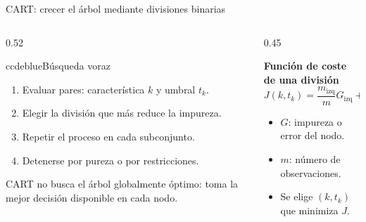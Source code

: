 \documentclass[aspectratio=169,11pt,table]{beamer}
\begin{document}
\begin{frame}{CART: crecer el árbol mediante divisiones binarias}
\footnotesize
\begin{columns}[T,onlytextwidth]
\begin{column}{0.52\textwidth}
\begin{contrastbox}{ccdeblue}{Búsqueda voraz}
\footnotesize
\begin{enumerate}
  \item Evaluar pares: característica \(k\) y umbral \(t_k\).
  \item Elegir la división que más reduce la impureza.
  \item Repetir el proceso en cada subconjunto.
  \item Detenerse por pureza o por restricciones.
\end{enumerate}
\end{contrastbox}
\vspace{0.22cm}
\begin{keybox}
CART no busca el árbol globalmente óptimo: toma la mejor decisión disponible en cada nodo.
\end{keybox}
\end{column}
\begin{column}{0.45\textwidth}
\begin{ccdebox}
\centering
\textbf{Función de coste de una división}
\[
J(k,t_k)=
\frac{m_{\mathrm{izq}}}{m}G_{\mathrm{izq}}
+\frac{m_{\mathrm{der}}}{m}G_{\mathrm{der}}
\]
\footnotesize
\begin{itemize}
  \item \(G\): impureza o error del nodo.
  \item \(m\): número de observaciones.
  \item Se elige \((k,t_k)\) que minimiza \(J\).
\end{itemize}
\end{ccdebox}
\vspace{0.18cm}
\centering
{}\\[0.14cm]
\end{column}
\end{columns}
\end{frame}
\end{document}
